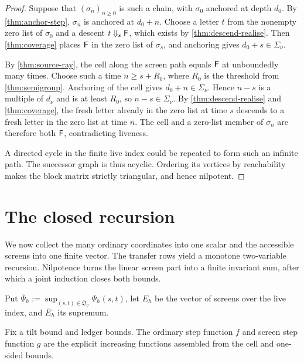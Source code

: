 \begin{proof}
\leanok
{}
Suppose that $(\sigma_n)_{n\geq0}$ is such a chain, with $\sigma_0$ anchored at depth $d_0$.
By \cref{thm:anchor-step}, $\sigma_n$ is anchored at $d_0+n$. Choose a letter $t$ from the
nonempty zero list of $\sigma_0$ and a descent $t\Downarrow_s\mathsf{F}$, which exists by
\cref{thm:descend-realise}. Then \cref{thm:coverage} places $\mathsf{F}$ in the zero list of
$\sigma_s$, and anchoring gives $d_0+s\in\Sigma_\nu$.

By \cref{thm:source-ray}, the cell along the screen path equals $\mathsf{F}$ at unboundedly many
times. Choose such a time $n\geq s+R_0$, where $R_0$ is the threshold from
\cref{thm:semigroup}. Anchoring of the cell gives $d_0+n\in\Sigma_\nu$. Hence $n-s$ is a
multiple of $d_\nu$ and is at least $R_0$, so $n-s\in\Sigma_\nu$. By
\cref{thm:descend-realise} and \cref{thm:coverage}, the fresh letter already in the zero list at
time $s$ descends to a fresh letter in the zero list at time $n$. The cell and a zero-list member of
$\sigma_n$ are therefore both $\mathsf{F}$, contradicting liveness.

A directed cycle in the finite live index could be repeated to form such an infinite path. The
successor graph is thus acyclic. Ordering its vertices by reachability makes the block matrix
strictly triangular, and hence nilpotent.
\end{proof}

\section{The closed recursion}

We now collect the many ordinary coordinates into one scalar and the accessible screens into one
finite vector. The transfer rows yield a monotone two-variable recursion. Nilpotence turns the
linear screen part into a finite invariant sum, after which a joint induction closes both bounds.

\begin{definition}
\label{def:running}
\leanok
{}
Put $\overline\Psi_h:=\sup_{(s,t)\in\mathfrak O_\nu}\Psi_h(s,t)$, let $E_h$ be the vector of
screens over the live index, and $\overline E_h$ its supremum.
\end{definition}

\begin{definition}
\label{def:step-functions}
\leanok
{}
Fix a tilt bound and ledger bounds. The ordinary step function $f$ and screen step function $g$
are the explicit increasing functions assembled from the cell and one-sided bounds.
\end{definition}

